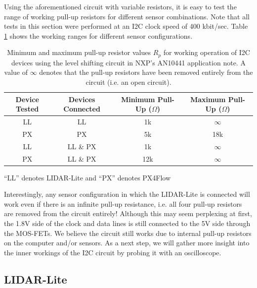 \documentclass[10pt]{article}
\begin{document}
Using the aforementioned circuit with variable resistors, it is easy to test the range of working pull-up resistors for different sensor combinations. Note that all tests in this section were performed at an I2C clock speed of 400 kbit/sec. Table \ref{table:pullup} shows the working ranges for different sensor configurations.
\begin{table}[ht]
\centering
\begin{threeparttable}
\begin{tabular}{| c | c | c | c |} 
\hline
\textbf{Device Tested} & \textbf{Devices Connected} & \textbf{Minimum Pull-Up ($\Omega$)} & \textbf{Maximum Pull-Up ($\Omega$)} \\
\hline
LL & LL & 1k & $\infty$ \\ %
\hline
PX & PX & 5k & 18k \\ %
\hline
LL & LL \& PX & 1k & $\infty$ \\
\hline
PX & LL \& PX & 12k & $\infty$ \\ %
\hline
\end{tabular}
\begin{tablenotes}
\small
\item *``LL'' denotes LIDAR-Lite and ``PX'' denotes PX4Flow
\end{tablenotes}
\caption{ Minimum and maximum pull-up resistor values $R_p$ for working operation of I2C devices using the level shifting circuit in NXP's AN10441 application note. A value of $\infty$ denotes that the pull-up resistors have been removed entirely from the circuit (i.e. an open circuit).}
\label{table:pullup}
\end{threeparttable}
\end{table}
Interestingly, any sensor configuration in which the LIDAR-Lite is connected will work even if there is an infinite pull-up resistance, i.e. all four pull-up resistors are removed from the circuit entirely! Although this may seem perplexing at first, the 1.8V side of the clock and data lines is still connected to the 5V side through the MOS-FETs. We believe the circuit still works due to internal pull-up resistors on the computer and/or sensors. As a next step, we will gather more insight into the inner workings of the I2C circuit by probing it with an oscilloscope. 

\subsection*{LIDAR-Lite}
\end{document}
